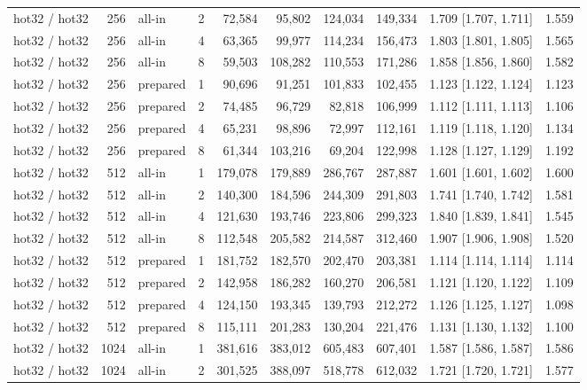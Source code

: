 \begin{table}[t]
{\begin{tabular}{lrlrrrrrlr}
hot32 / hot32 & 256 & all-in & 2 & 72{,}584 & 95{,}802 & 124{,}034 & 149{,}334 & 1.709 [1.707, 1.711] & 1.559 \\
hot32 / hot32 & 256 & all-in & 4 & 63{,}365 & 99{,}977 & 114{,}234 & 156{,}473 & 1.803 [1.801, 1.805] & 1.565 \\
hot32 / hot32 & 256 & all-in & 8 & 59{,}503 & 108{,}282 & 110{,}553 & 171{,}286 & 1.858 [1.856, 1.860] & 1.582 \\
hot32 / hot32 & 256 & prepared & 1 & 90{,}696 & 91{,}251 & 101{,}833 & 102{,}455 & 1.123 [1.122, 1.124] & 1.123 \\
hot32 / hot32 & 256 & prepared & 2 & 74{,}485 & 96{,}729 & 82{,}818 & 106{,}999 & 1.112 [1.111, 1.113] & 1.106 \\
hot32 / hot32 & 256 & prepared & 4 & 65{,}231 & 98{,}896 & 72{,}997 & 112{,}161 & 1.119 [1.118, 1.120] & 1.134 \\
hot32 / hot32 & 256 & prepared & 8 & 61{,}344 & 103{,}216 & 69{,}204 & 122{,}998 & 1.128 [1.127, 1.129] & 1.192 \\
hot32 / hot32 & 512 & all-in & 1 & 179{,}078 & 179{,}889 & 286{,}767 & 287{,}887 & 1.601 [1.601, 1.602] & 1.600 \\
hot32 / hot32 & 512 & all-in & 2 & 140{,}300 & 184{,}596 & 244{,}309 & 291{,}803 & 1.741 [1.740, 1.742] & 1.581 \\
hot32 / hot32 & 512 & all-in & 4 & 121{,}630 & 193{,}746 & 223{,}806 & 299{,}323 & 1.840 [1.839, 1.841] & 1.545 \\
hot32 / hot32 & 512 & all-in & 8 & 112{,}548 & 205{,}582 & 214{,}587 & 312{,}460 & 1.907 [1.906, 1.908] & 1.520 \\
hot32 / hot32 & 512 & prepared & 1 & 181{,}752 & 182{,}570 & 202{,}470 & 203{,}381 & 1.114 [1.114, 1.114] & 1.114 \\
hot32 / hot32 & 512 & prepared & 2 & 142{,}958 & 186{,}282 & 160{,}270 & 206{,}581 & 1.121 [1.120, 1.122] & 1.109 \\
hot32 / hot32 & 512 & prepared & 4 & 124{,}150 & 193{,}345 & 139{,}793 & 212{,}272 & 1.126 [1.125, 1.127] & 1.098 \\
hot32 / hot32 & 512 & prepared & 8 & 115{,}111 & 201{,}283 & 130{,}204 & 221{,}476 & 1.131 [1.130, 1.132] & 1.100 \\
hot32 / hot32 & 1024 & all-in & 1 & 381{,}616 & 383{,}012 & 605{,}483 & 607{,}401 & 1.587 [1.586, 1.587] & 1.586 \\
hot32 / hot32 & 1024 & all-in & 2 & 301{,}525 & 388{,}097 & 518{,}778 & 612{,}032 & 1.721 [1.720, 1.721] & 1.577 \\

\end{tabular}}
\end{table}
